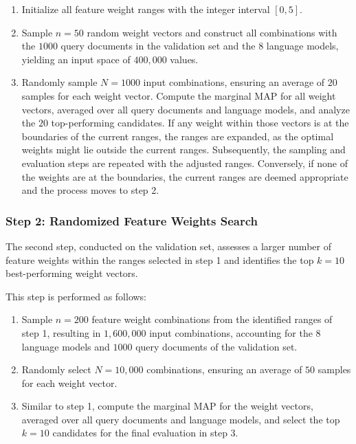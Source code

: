 \begin{enumerate}
    \item Initialize all feature weight ranges with the integer interval $[0, 5]$.
    \item Sample $n=50$ random weight vectors and construct all combinations with the $1000$ query documents in the validation set and the $8$ language models, yielding an input space of $400,000$ values.
    \item Randomly sample $N=1000$ input combinations, ensuring an average of $20$ samples for each weight vector.
          Compute the marginal \ac{MAP} for all weight vectors, averaged over all query documents and language models, and analyze the $20$ top-performing candidates.
          If any weight within those vectors is at the boundaries of the current ranges, the ranges are expanded, as the optimal weights might lie outside the current ranges.
          Subsequently, the sampling and evaluation steps are repeated with the adjusted ranges.
          Conversely, if none of the weights are at the boundaries, the current ranges are deemed appropriate and the process moves to step 2.
\end{enumerate}


\subsubsection*{Step 2: Randomized Feature Weights Search}

The second step, conducted on the validation set, assesses a larger number of feature weights within the ranges selected in step 1 and identifies the top $k=10$ best-performing weight vectors.

This step is performed as follows:

\begin{enumerate}
    \item Sample $n=200$ feature weight combinations from the identified ranges of step 1, resulting in $1,600,000$ input combinations, accounting for the $8$ language models and $1000$ query documents of the validation set.
    \item Randomly select $N=10,000$ combinations, ensuring an average of $50$ samples for each weight vector.
    \item Similar to step 1, compute the marginal \ac{MAP} for the weight vectors, averaged over all query documents and language models, and select the top $k=10$ candidates for the final evaluation in step 3.
\end{enumerate}

